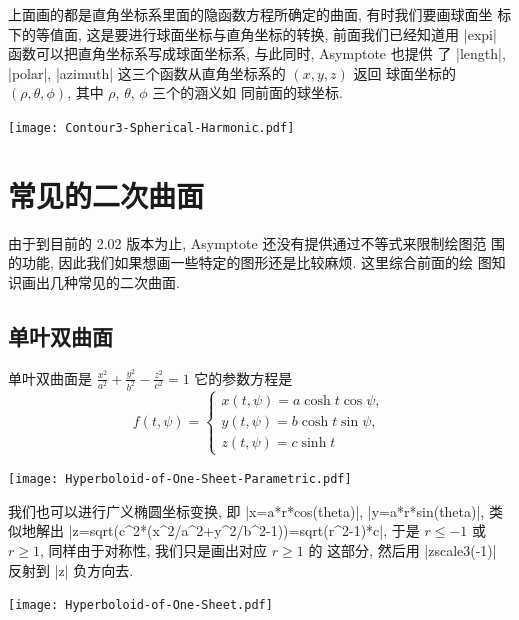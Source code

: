 \documentclass[nofonts,CJKnormalspaces]{ctexbook}[2009/05/20]
\let\leq\leqslant
\let\geq\geqslant
\begin{document}
上面画的都是直角坐标系里面的隐函数方程所确定的曲面, 有时我们要画球面坐
标下的等值面, 这是要进行球面坐标与直角坐标的转换, 前面我们已经知道用
|expi| 函数可以把直角坐标系写成球面坐标系, 与此同时, Asymptote 也提供
了 |length|, |polar|, |azimuth| 这三个函数从直角坐标系的 $(x,y,z)$ 返回
球面坐标的 $(\rho,\theta,\phi)$, 其中 $\rho$, $\theta$, $\phi$ 三个的涵义如
同前面的球坐标.
\begin{center}\texttt{[image: Contour3-Spherical-Harmonic.pdf]}\end{center}%


\section{常见的二次曲面}
由于到目前的 2.02 版本为止, Asymptote 还没有提供通过不等式来限制绘图范
围的功能, 因此我们如果想画一些特定的图形还是比较麻烦. 这里综合前面的绘
图知识画出几种常见的二次曲面.


\subsection{单叶双曲面}
单叶双曲面是
$\frac{x^{2}}{a^{2}}+\frac{y^{2}}{b^{2}}-\frac{z^{2}}{c^{2}}=1$
它的参数方程是
\begin{equation}
  f(t,\psi)=\left\{
    \begin{array}{ll}
      x(t,\psi)=a\cosh t\cos\psi,\\
      y(t,\psi)=b\cosh t\sin\psi,\\
      z(t,\psi)=c\sinh t
    \end{array}\right.
\end{equation}
\begin{center}\texttt{[image: Hyperboloid-of-One-Sheet-Parametric.pdf]}\end{center}%

我们也可以进行广义椭圆坐标变换, 即 |x=a*r*cos(theta)|, |y=a*r*sin(theta)|,
类似地解出
|z=sqrt(c^2*(x^2/a^2+y^2/b^2-1))=sqrt(r^2-1)*c|, 于是
$r\leq -1$ 或 $r\geq 1$, 同样由于对称性, 我们只是画出对应 $r\geq 1$ 的
这部分, 然后用 |zscale3(-1)| 反射到 |z| 负方向去.
\begin{center}\texttt{[image: Hyperboloid-of-One-Sheet.pdf]}\end{center}%

\end{document}
